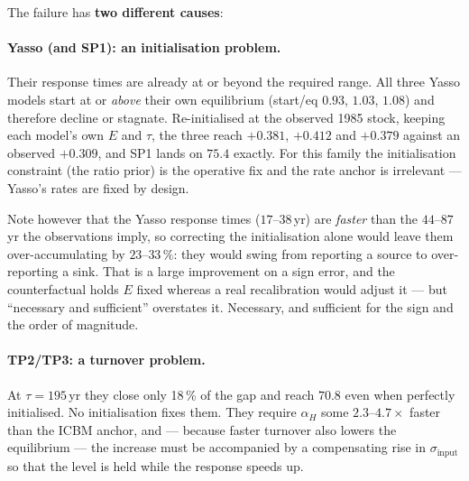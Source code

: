 \documentclass[11pt]{article}
\newcommand{\sinput}{\sigma_{\mathrm{input}}}
\begin{document}
\noindent The failure has \textbf{two different causes}:

\paragraph{Yasso (and SP1): an initialisation problem.} Their response times are already at or
beyond the required range. All three Yasso models start at or \emph{above} their own equilibrium
(start/eq $0.93$, $1.03$, $1.08$) and therefore decline or stagnate. Re-initialised at the
observed 1985 stock, keeping each model's own $E$ and $\tau$, the three reach $+0.381$, $+0.412$
and $+0.379$ against an observed $+0.309$, and SP1 lands on $75.4$ exactly. For this family the
initialisation constraint (the ratio prior) is the operative fix and the rate anchor is irrelevant --- Yasso's
rates are fixed by design.

Note however that the Yasso response times ($17$--$38$\,yr) are \emph{faster} than the
$44$--$87$\,yr the observations imply, so correcting the initialisation alone would leave them
over-accumulating by $23$--$33\,\%$: they would swing from reporting a source to over-reporting a
sink. That is a large improvement on a sign error, and the counterfactual holds $E$ fixed whereas
a real recalibration would adjust it --- but ``necessary and sufficient'' overstates it. Necessary,
and sufficient for the sign and the order of magnitude.

\paragraph{TP2/TP3: a turnover problem.} At $\tau = 195$\,yr they close only 18\,\% of the gap
and reach $70.8$ even when perfectly initialised. No initialisation fixes them. They require
$\alpha_H$ some $2.3$--$4.7\times$ faster than the ICBM anchor, and --- because faster turnover
also lowers the equilibrium --- the increase must be accompanied by a compensating rise in
$\sinput$ so that the level is held while the response speeds up.
\end{document}
